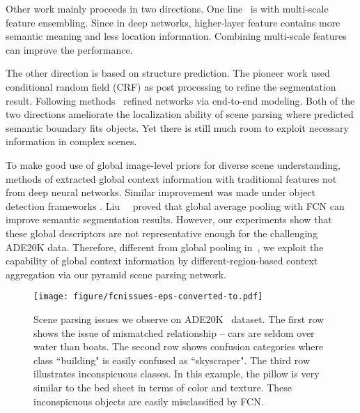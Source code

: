 \documentclass[10pt,twocolumn,letterpaper]{article}
\begin{document}
Other work mainly proceeds in two directions. One
line~\cite{long2015fully,chen2014semantic,chen2015attention,xia2016zoom,hariharan2015hypercolumns}
is with multi-scale feature ensembling. Since in deep networks, higher-layer feature
contains more semantic meaning and less location information. Combining multi-scale
features can improve the performance.

The other direction is based on structure prediction. The pioneer work
\cite{chen2014semantic} used conditional random field (CRF) as post processing to refine
the segmentation result. Following
methods~\cite{liu2015semantic,zheng2015conditional,arnab2016higher} refined networks via
end-to-end modeling. Both of the two directions ameliorate the localization ability of
scene parsing where predicted semantic boundary fits objects. Yet there is still much
room to exploit necessary information in complex scenes.

To make good use of global image-level priors for diverse scene understanding, methods of
\cite{lazebnik2006beyond,lucchi2011spatial} extracted global context information with
traditional features not from deep neural networks. Similar improvement was made under
object detection frameworks \cite{szegedy2014scalable}. Liu~\etal~\cite{liu2015parsenet}
proved that global average pooling with FCN can improve semantic segmentation results.
However, our experiments show that these global descriptors are not representative enough
for the challenging ADE20K data. Therefore, different from global pooling
in~\cite{liu2015parsenet}, we exploit the capability of global context information by
different-region-based context aggregation via our pyramid scene parsing network.

\begin{figure*}
\begin{center}
\texttt{[image: figure/fcnissues-eps-converted-to.pdf]}
\end{center}
\caption{Scene parsing issues we observe on ADE20K~\cite{zhou2016semantic} dataset. The
first row shows the issue of mismatched relationship -- cars are seldom over water than
boats. The second row shows confusion categories where class ``building" is easily
confused as ``skyscraper". The third row illustrates inconspicuous classes. In this
example, the pillow is very similar to the bed sheet in terms of color and texture. These
inconspicuous objects are easily misclassified by FCN. } \label{fig:fcnissues}
\end{figure*}
\end{document}
